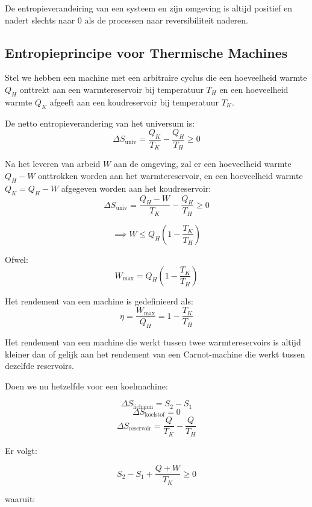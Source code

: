 \begin{postulate}
    De entropieverandeiring van een systeem en zijn omgeving is altijd positief en nadert slechts naar 0 als de processen naar reversibiliteit naderen.
\end{postulate}

\subsection{Entropieprincipe voor Thermische Machines}

Stel we hebben een machine met een arbitraire cyclus die een hoeveelheid warmte \(Q_H\) onttrekt aan een warmtereservoir bij temperatuur \(T_H\) en een hoeveelheid warmte \(Q_K\) afgeeft aan een koudreservoir bij temperatuur \(T_K\).

De netto entropieverandering van het universum is:
\[\Delta S_{\text{univ}} = \frac{Q_K}{T_K} - \frac{Q_H}{T_H} \geq 0\]

Na het leveren van arbeid \(W\) aan de omgeving, zal er een hoeveelheid warmte \(Q_H - W\) onttrokken worden aan het warmtereservoir, en een hoeveelheid warmte \(Q_K = Q_H - W\) afgegeven worden aan het koudreservoir:
\[\Delta S_{\text{univ}} = \frac{Q_H - W}{T_K} - \frac{Q_H}{T_H} \geq 0\]

\[\implies W \leq Q_H \left(1 - \frac{T_K}{T_H}\right)\]

Ofwel:
\begin{equation}
\label{eq:W_max}
W_{\text{max}} = Q_H \left(1 - \frac{T_K}{T_H}\right)
\end{equation}

Het rendement van een machine is gedefinieerd als:
\[\eta = \frac{W_{\text{max}}}{Q_H} = 1 - \frac{T_K}{T_H}\]

\begin{postulate}
    Het rendement van een machine die werkt tussen twee warmtereservoirs is altijd kleiner dan of gelijk aan het rendement van een Carnot-machine die werkt tussen dezelfde reservoirs.
\end{postulate}

Doen we nu hetzelfde voor een koelmachine:

\[\Delta S_{\text{lichaam}} = S_2 - S_1\]
\[\Delta S_{\text{koelstof}} = 0\]
\[\Delta S_{\text{reservoir}} = \frac{Q}{T_K} - \frac{Q}{T_H}\]

Er volgt:

\[
S_2-S_1 + \frac{Q + W }{T_K} \geq 0
\]

waaruit:

